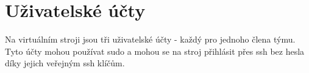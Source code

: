 \section{Uživatelské účty}
Na virtuálním stroji jsou tři uživatelské účty - každý pro jednoho člena týmu. Tyto účty mohou používat sudo a mohou se na stroj přihlásit přes ssh bez hesla díky jejich veřejným ssh klíčům.